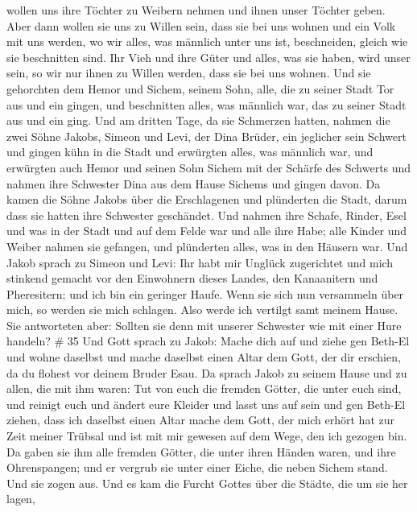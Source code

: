 wollen uns ihre Töchter zu Weibern nehmen und ihnen unser Töchter geben.
 Aber dann wollen sie uns zu Willen sein, dass sie bei uns
wohnen und ein Volk mit uns werden, wo wir alles, was männlich unter uns
ist, beschneiden, gleich wie sie beschnitten sind.  Ihr
Vieh und ihre Güter und alles, was sie haben, wird unser sein, so wir
nur ihnen zu Willen werden, dass sie bei uns wohnen.  Und
sie gehorchten dem Hemor und Sichem, seinem Sohn, alle, die zu seiner
Stadt Tor aus und ein gingen, und beschnitten alles, was männlich war,
das zu seiner Stadt aus und ein ging.  Und am dritten Tage,
da sie Schmerzen hatten, nahmen die zwei Söhne Jakobs, Simeon und Levi,
der Dina Brüder, ein jeglicher sein Schwert und gingen kühn in die Stadt
und erwürgten alles, was männlich war,  und erwürgten auch
Hemor und seinen Sohn Sichem mit der Schärfe des Schwerts und nahmen
ihre Schwester Dina aus dem Hause Sichems und gingen davon.
 Da kamen die Söhne Jakobs über die Erschlagenen und
plünderten die Stadt, darum dass sie hatten ihre Schwester geschändet.
 Und nahmen ihre Schafe, Rinder, Esel und was in der Stadt
und auf dem Felde war  und alle ihre Habe; alle Kinder und
Weiber nahmen sie gefangen, und plünderten alles, was in den Häusern
war.  Und Jakob sprach zu Simeon und Levi: Ihr habt mir
Unglück zugerichtet und mich stinkend gemacht vor den Einwohnern dieses
Landes, den Kanaanitern und Pheresitern; und ich bin ein geringer Haufe.
Wenn sie sich nun versammeln über mich, so werden sie mich schlagen.
Also werde ich vertilgt samt meinem Hause.  Sie antworteten
aber: Sollten sie denn mit unserer Schwester wie mit einer Hure handeln?
\# 35  Und Gott sprach zu Jakob: Mache dich auf und ziehe
gen Beth-El und wohne daselbst und mache daselbst einen Altar dem Gott,
der dir erschien, da du flohest vor deinem Bruder Esau.  Da
sprach Jakob zu seinem Hause und zu allen, die mit ihm waren: Tut von
euch die fremden Götter, die unter euch sind, und reinigt euch und
ändert eure Kleider  und lasst uns auf sein und gen Beth-El
ziehen, dass ich daselbst einen Altar mache dem Gott, der mich erhört
hat zur Zeit meiner Trübsal und ist mit mir gewesen auf dem Wege, den
ich gezogen bin.  Da gaben sie ihm alle fremden Götter, die
unter ihren Händen waren, und ihre Ohrenspangen; und er vergrub sie
unter einer Eiche, die neben Sichem stand.  Und sie zogen
aus. Und es kam die Furcht Gottes über die Städte, die um sie her lagen,
